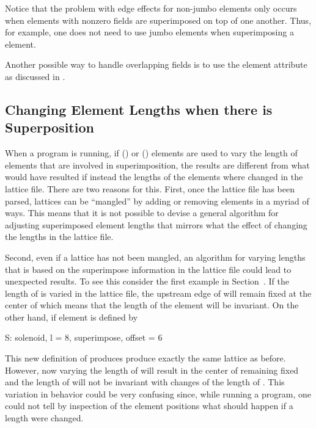 Notice that the problem with edge effects for non-jumbo
 elements only occurs when elements with nonzero
fields are superimposed on top of one another. Thus, for example, one
does not need to use jumbo elements when superimposing a 
element.

Another possible way to handle overlapping fields is to use the 
element attribute as discussed in .

\subsection{Changing Element Lengths when there is Superposition}
\label{s:super.length}

When a program is running, if  () or
 () elements are used to vary the length
of elements that are involved in superimposition, the results are
different from what would have resulted if instead the lengths of the
elements where changed in the lattice file. There are two reasons for
this. First, once the lattice file has been parsed, lattices can be
``mangled'' by adding or removing elements in a myriad of ways. This
means that it is not possible to devise a general algorithm for
adjusting superimposed element lengths that mirrors what the effect of
changing the lengths in the lattice file.

Second, even if a lattice has not been mangled, an algorithm for
varying lengths that is based on the superimpose information in the
lattice file could lead to unexpected results. To see this consider
the first example in Section~. If the length of 
is varied in the lattice file, the upstream edge of  will remain
fixed at the center of  which means that the length of the
 element  will be invariant. On the other
hand, if element  is defined by 
\begin{example}
  S: solenoid, l = 8, superimpose, offset = 6
\end{example}
This new definition of  produces produce exactly the same
lattice as before. However, now varying the length of  will
result in the center of  remaining fixed and the length of
 will not be invariant with changes of the length of
. This variation in behavior could be very confusing since,
while running a program, one could not tell by inspection of the
element positions what should happen if a length were changed.

